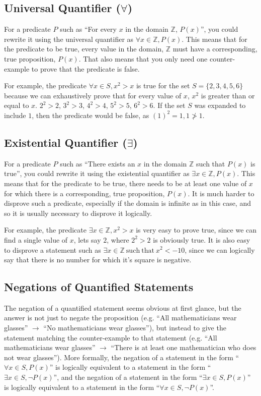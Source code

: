 \subsection*{Universal Quantifier ($\forall$)}

For a predicate $P$ such as ``For every $x$ in the domain $\mathbb{Z}$, $P(x)$'', you could rewrite it using the
 universal quantifier as $\forall x \in \mathbb{Z}, P(x)$. This means that for the predicate to be true, every value
 in the domain, $\mathbb{Z}$ must have a corresponding, true proposition, $P(x)$. That also means that you only need one
 counter-example to prove that the predicate is false.

For example, the predicate $\forall x \in S, x^2 > x$ is true for the set $S = \{2,3,4,5,6\}$ because we can
 exhaustively prove that for every value of $x$, $x^2$ is greater than or equal to $x$. $2^2 > 2$, $3^2 > 3$, $4^2 > 4$,
 $5^2 > 5$, $6^2 > 6$. If the set $S$ was expanded to include $1$, then the predicate would be
 false, as $(1)^2 = 1, 1 \ngtr 1$.

\subsection*{Existential Quantifier ($\exists$)}

For a predicate $P$ such as ``There exists an $x$ in the domain $\mathbb{Z}$ such that $P(x)$ is true'', you could
 rewrite it using the existential quantifier as $\exists x \in \mathbb{Z}, P(x)$. This means that for the predicate to
 be true, there needs to be at least one value of $x$ for which there is a corresponding, true proposition, $P(x)$. It
 is much harder to disprove such a predicate, especially if the domain is infinite as in this case, and so it is usually
 necessary to disprove it logically.

For example, the predicate $\exists x \in \mathbb{Z}, x^2 > x$ is very easy to prove true, since we can find a single
 value of $x$, lets say $2$, where $2^2 > 2$ is obviously true. It is also easy to disprove a statement such as
 $\exists x \in \mathbb{Z} \mathrm{\ such\ that\ } x^2 < -10$, since we can logically say that there is no number for
 which it's square is negative.

\subsection*{Negations of Quantified Statements}

The negation of a quantified statement seems obvious at first glance, but the answer is not just to negate the
 proposition (e.g. ``All mathematicians wear glasses'' $\rightarrow$ ``No mathematicians wear glasses''), but instead to
 give the statement matching the counter-example to that statement (e.g. ``All mathematicians wear glasses''
 $\rightarrow$ ``There is at least one mathematician who does not wear glasses''). More formally, the negation of a
 statement in the form ``$\forall x \in S, P(x)$'' is logically equivalent to a statement in the form 
 ``$\exists x \in S, \neg P(x)$'', and the negation of a statement in the form ``$\exists x \in S, P(x)$'' is logically
 equivalent to a statement in the form ``$\forall x \in S, \neg P(x)$''.

